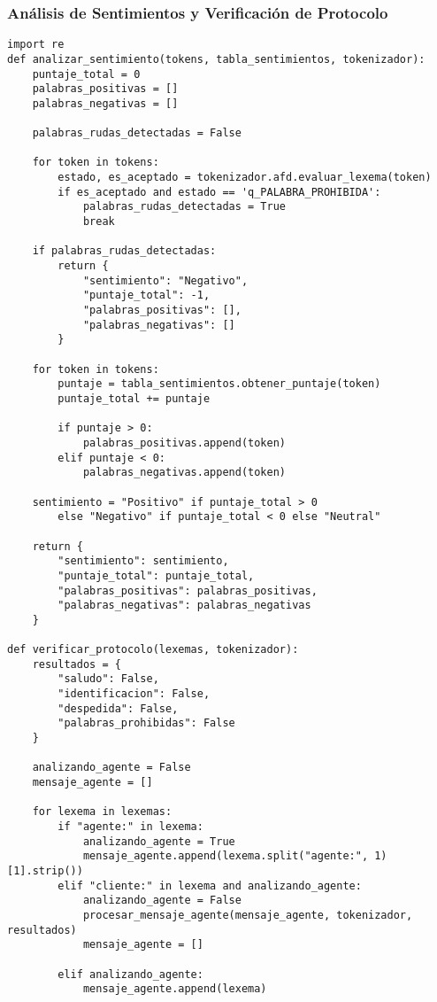 \documentclass[12pt,a4paper]{article}
\begin{document}
\subsubsection{ Análisis de Sentimientos y Verificación de Protocolo}
\begin{verbatim}
import re
def analizar_sentimiento(tokens, tabla_sentimientos, tokenizador):
    puntaje_total = 0
    palabras_positivas = []
    palabras_negativas = []

    palabras_rudas_detectadas = False

    for token in tokens:
        estado, es_aceptado = tokenizador.afd.evaluar_lexema(token)
        if es_aceptado and estado == 'q_PALABRA_PROHIBIDA':
            palabras_rudas_detectadas = True
            break 

    if palabras_rudas_detectadas:
        return {
            "sentimiento": "Negativo",
            "puntaje_total": -1,
            "palabras_positivas": [],
            "palabras_negativas": []
        }
    
    for token in tokens:
        puntaje = tabla_sentimientos.obtener_puntaje(token)
        puntaje_total += puntaje

        if puntaje > 0:
            palabras_positivas.append(token)
        elif puntaje < 0:
            palabras_negativas.append(token)
    
    sentimiento = "Positivo" if puntaje_total > 0 
        else "Negativo" if puntaje_total < 0 else "Neutral"
    
    return {
        "sentimiento": sentimiento,
        "puntaje_total": puntaje_total,
        "palabras_positivas": palabras_positivas,
        "palabras_negativas": palabras_negativas
    }

def verificar_protocolo(lexemas, tokenizador):
    resultados = {
        "saludo": False,
        "identificacion": False,
        "despedida": False,
        "palabras_prohibidas": False
    }

    analizando_agente = False
    mensaje_agente = []

    for lexema in lexemas:
        if "agente:" in lexema:
            analizando_agente = True
            mensaje_agente.append(lexema.split("agente:", 1)[1].strip())
        elif "cliente:" in lexema and analizando_agente:
            analizando_agente = False
            procesar_mensaje_agente(mensaje_agente, tokenizador, resultados)
            mensaje_agente = []  

        elif analizando_agente:
            mensaje_agente.append(lexema)


\end{verbatim}
\end{document}
